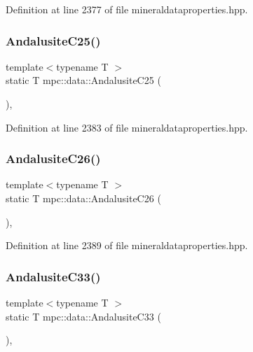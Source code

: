 Definition at line 2377 of file mineraldataproperties.\+hpp.

\mbox{\label{namespacempc_1_1data_a6a621576fb3619a7780264daddb59117}} 
\subsubsection{\texorpdfstring{Andalusite\+C25()}{AndalusiteC25()}}
{\footnotesize\ttfamily template$<$typename T $>$ \\
static T mpc\+::data\+::\+Andalusite\+C25 (\begin{DoxyParamCaption}{ }\end{DoxyParamCaption})\hspace{0.3cm}{\ttfamily [inline]}, {\ttfamily [static]}}



Definition at line 2383 of file mineraldataproperties.\+hpp.

\mbox{\label{namespacempc_1_1data_a4dae1fc5875eb1fc694e2b38e49af4dc}} 
\subsubsection{\texorpdfstring{Andalusite\+C26()}{AndalusiteC26()}}
{\footnotesize\ttfamily template$<$typename T $>$ \\
static T mpc\+::data\+::\+Andalusite\+C26 (\begin{DoxyParamCaption}{ }\end{DoxyParamCaption})\hspace{0.3cm}{\ttfamily [inline]}, {\ttfamily [static]}}



Definition at line 2389 of file mineraldataproperties.\+hpp.

\mbox{\label{namespacempc_1_1data_a6eab4de76f7a41f3d7de1ec10dbeabda}} 
\subsubsection{\texorpdfstring{Andalusite\+C33()}{AndalusiteC33()}}
{\footnotesize\ttfamily template$<$typename T $>$ \\
static T mpc\+::data\+::\+Andalusite\+C33 (\begin{DoxyParamCaption}{ }\end{DoxyParamCaption})\hspace{0.3cm}{\ttfamily [inline]}, {\ttfamily [static]}}




